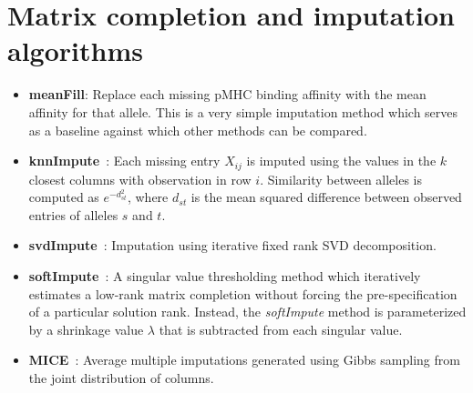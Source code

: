 \section*{Matrix completion and imputation algorithms}

\begin{itemize}
\item {\bf meanFill}: Replace each missing pMHC binding affinity with the mean affinity for that allele. This is a very simple imputation method which serves as a baseline against which other methods can be compared. 

\item {\bf knnImpute}~\cite{Troyanskaya_2001}: Each missing entry $X_{ij}$ is imputed using the values in the $k$ closest columns with observation in row $i$.  Similarity between alleles is computed as $e^{-d_{st}^2}$, where $d_{st}$ is the mean squared difference between observed entries of alleles $s$ and $t$. 

\item {\bf svdImpute}~\cite{Troyanskaya_2001}: Imputation using iterative fixed rank SVD decomposition. 

\item {\bf softImpute}~\cite{Mazumder2010SpectralMatrices}: A singular value thresholding method which iteratively estimates a low-rank matrix completion without forcing the pre-specification of a particular solution rank. Instead, the {\it softImpute} method is parameterized by a shrinkage value $\lambda$ that is subtracted from each singular value. 

\item {\bf MICE}~\cite{Azur_2011}: Average multiple imputations generated using Gibbs sampling from the joint distribution of columns. 
\end{itemize}



